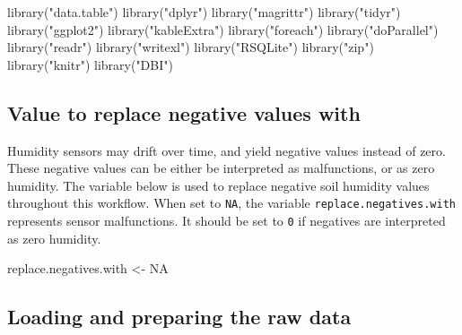 \documentclass[
  table]{article}
\newenvironment{Shaded}{\begin{snugshade}}{\end{snugshade}}
\newcommand{\ConstantTok}[1]{\textcolor[rgb]{0.00,0.00,0.00}{#1}}
\newcommand{\FunctionTok}[1]{\textcolor[rgb]{0.00,0.00,0.00}{#1}}
\newcommand{\NormalTok}[1]{#1}
\newcommand{\OtherTok}[1]{\textcolor[rgb]{0.56,0.35,0.01}{#1}}
\newcommand{\StringTok}[1]{\textcolor[rgb]{0.31,0.60,0.02}{#1}}
\begin{document}
\begin{Shaded}
\begin{Highlighting}[]
\FunctionTok{library}\NormalTok{(}\StringTok{"data.table"}\NormalTok{)}
\FunctionTok{library}\NormalTok{(}\StringTok{"dplyr"}\NormalTok{)}
\FunctionTok{library}\NormalTok{(}\StringTok{"magrittr"}\NormalTok{)}
\FunctionTok{library}\NormalTok{(}\StringTok{"tidyr"}\NormalTok{)}
\FunctionTok{library}\NormalTok{(}\StringTok{"ggplot2"}\NormalTok{)}
\FunctionTok{library}\NormalTok{(}\StringTok{"kableExtra"}\NormalTok{)}
\FunctionTok{library}\NormalTok{(}\StringTok{"foreach"}\NormalTok{)}
\FunctionTok{library}\NormalTok{(}\StringTok{"doParallel"}\NormalTok{)}
\FunctionTok{library}\NormalTok{(}\StringTok{"readr"}\NormalTok{)}
\FunctionTok{library}\NormalTok{(}\StringTok{"writexl"}\NormalTok{)}
\FunctionTok{library}\NormalTok{(}\StringTok{"RSQLite"}\NormalTok{)}
\FunctionTok{library}\NormalTok{(}\StringTok{"zip"}\NormalTok{)}
\FunctionTok{library}\NormalTok{(}\StringTok{"knitr"}\NormalTok{)}
\FunctionTok{library}\NormalTok{(}\StringTok{"DBI"}\NormalTok{)}
\end{Highlighting}
\end{Shaded}

\hypertarget{value-to-replace-negative-values-with}{%
\subsection{Value to replace negative values
with}\label{value-to-replace-negative-values-with}}

Humidity sensors may drift over time, and yield negative values instead
of zero. These negative values can be either be interpreted as
malfunctions, or as zero humidity. The variable below is used to replace
negative soil humidity values throughout this workflow. When set to
\texttt{NA}, the variable \texttt{replace.negatives.with} represents
sensor malfunctions. It should be set to \texttt{0} if negatives are
interpreted as zero humidity.

\begin{Shaded}
\begin{Highlighting}[]
\NormalTok{replace.negatives.with }\OtherTok{\textless{}{-}} \ConstantTok{NA} 
\end{Highlighting}
\end{Shaded}

\hypertarget{loading-and-preparing-the-raw-data}{%
\subsection{Loading and preparing the raw
data}\label{loading-and-preparing-the-raw-data}}
\end{document}
